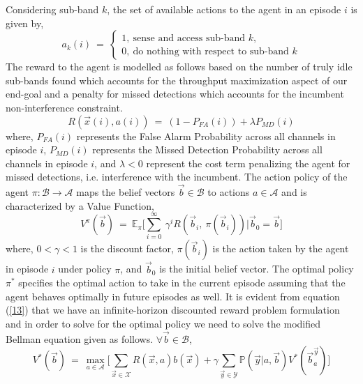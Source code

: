\documentclass[10pt,twocolumn]{IEEEtran}
\begin{document}
Considering sub-band $k$, the set of available actions to the agent in an episode $i$ is given by,
\begin{equation}\label{12}
    a_k(i)\ =\ 
    \begin{cases}
        1,\ \text{sense and access sub-band $k$},\\
        0,\ \text{do nothing with respect to sub-band $k$}
    \end{cases}
\end{equation}
The reward to the agent is modelled as follows based on the number of truly idle sub-bands found which accounts for the throughput maximization aspect of our end-goal and a penalty for missed detections which accounts for the incumbent non-interference constraint.
\begin{equation}\label{13}
    R(\vec{x}(i),a(i))\ =\ (1 - P_{FA}(i)) + \lambda P_{MD}(i)
\end{equation}
where, $P_{FA}(i)$ represents the False Alarm Probability across all channels in episode $i$, $P_{MD}(i)$ represents the Missed Detection Probability across all channels in episode $i$, and $\lambda < 0$ represent the cost term penalizing the agent for missed detections, i.e. interference with the incumbent. The action policy of the agent $\pi: \mathcal{B} \rightarrow \mathcal{A}$ maps the belief vectors $\vec{b} \in \mathcal{B}$ to actions $a \in \mathcal{A}$ and is characterized by a Value Function,
\begin{equation}\label{14}
    V^{\pi}(\vec{b})\ =\ \mathbb{E}_{\pi}\Big[\sum_{i=0}^{\infty}\ \gamma^i R(\vec{b}_i,\ \pi(\vec{b}_i))|\vec{b}_0=\vec{b}\Big]
\end{equation}
where, $0 < \gamma < 1$ is the discount factor, $\pi(\vec{b}_i)$ is the action taken by the agent in episode $i$ under policy $\pi$, and $\vec{b}_0$ is the initial belief vector. The optimal policy $\pi^*$ specifies the optimal action to take in the current episode assuming that the agent behaves optimally in future episodes as well. It is evident from equation (\ref{13}) that we have an infinite-horizon discounted reward problem formulation and in order to solve for the optimal policy we need to solve the modified Bellman equation given as follows. $\forall \vec{b} \in \mathcal{B}$,
\begin{equation}\label{15}
    V^*(\vec{b})\ =\ \max_{a \in \mathcal{A}}\Big[\sum_{\vec{x} \in \mathcal{X}}R(\vec{x},a)b(\vec{x}) + \gamma \sum_{\vec{y} \in \mathcal{Y}}\mathbb{P}(\vec{y}|a,\vec{b})V^*(\vec{b}_a^{\vec{y}})\Big]
\end{equation}
\end{document}
